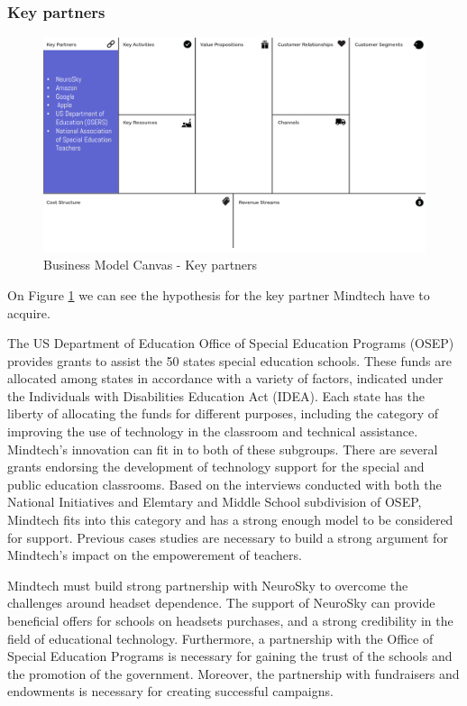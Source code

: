 \documentclass[letterpaper,10pt]{article}
\begin{document}
\subsubsection{Key partners}

\begin{figure}[!htb]
\centering
\includegraphics[scale=0.5]{part.PNG}
\caption{Business Model Canvas - Key partners}
\label{img:BMC_keypart}
\end{figure}


On Figure \ref{img:BMC_keypart} we can see the hypothesis for the key partner Mindtech have to acquire. 

The US Department of Education Office of Special Education Programs (OSEP) provides grants to assist the 50 states special education schools. These funds are allocated among states in accordance with a variety of factors, indicated under the Individuals with Disabilities Education Act (IDEA). Each state has the liberty of allocating the funds for different purposes, including the category of improving the use of technology in the classroom and technical assistance. \cite{grants} 
Mindtech's innovation can fit in to both of these subgroups. There are several grants endorsing the development of technology support for the special and public education classrooms. Based on the interviews conducted with both the National Initiatives and Elemtary and Middle School subdivision of OSEP, Mindtech fits into this category and has a strong enough model to be considered for support. Previous cases studies are necessary to build a strong argument for Mindtech's impact on the empowerement of teachers.


Mindtech must build strong partnership with NeuroSky to overcome the challenges around headset dependence. The support of NeuroSky can provide beneficial offers for schools on headsets purchases, and a strong credibility in the field of educational technology. Furthermore, a partnership with the Office of Special Education Programs is necessary for gaining the trust of the schools and the promotion of the government. Moreover, the partnership with fundraisers and endowments is necessary for creating successful campaigns.
\end{document}
